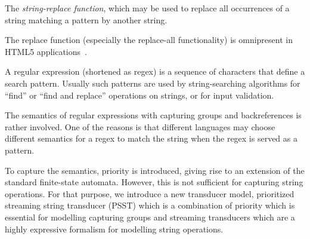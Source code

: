 {%
%
%

The \emph{string-replace function},
which may be used to replace all occurrences of a string matching a pattern by
another string.

The replace function (especially
the replace-all functionality) is omnipresent in HTML5 applications~\cite{LB16,TCJ16,YABI14}.

A regular expression (shortened as regex) is a sequence of characters that define a search pattern. Usually such patterns are used by string-searching algorithms for ``find'' or ``find and replace'' operations on strings, or for input validation.

The semantics of regular expressions with capturing groups and backreferences is rather involved. One of the reasons is that different languages may choose different semantics for a regex to match the string when the regex is served as a pattern.

To capture the semantics, priority is introduced, giving rise to an extension of the standard finite-state automata. However, this is not sufficient for capturing string operations. For that purpose, we introduce  a new transducer model, prioritized streaming string transducer (PSST) which is a combination of priority which is essential for modelling capturing groups and streaming transducers which are a highly expressive formalism for modelling string operations.
}
